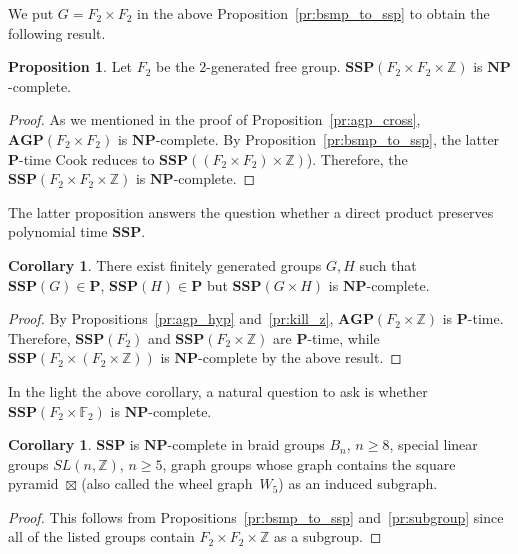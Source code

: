 \documentclass[10pt]{amsart}
\theoremstyle{definition}
\newtheorem{proposition}[theorem]{Proposition}
\newtheorem{corollary}[theorem]{Corollary}
\def\P{{\mathbf{P}}}
\def\NP{{\mathbf{NP}}}
\def\SSP{{\mathbf{SSP}}}
\def\AGP{{\mathbf{AGP}}}
\begin{document}
We put $G=F_2\times F_2$ in the above Proposition~\ref{pr:bsmp_to_ssp} to obtain the following result.
\begin{proposition}\label{pr:ssp_cross}
Let $F_2$ be the $2$-generated free group. $\SSP(F_2\times F_2\times \mathbb Z)$ is $\NP$-complete.
\end{proposition}
\begin{proof}
As we mentioned in the proof of Proposition~\ref{pr:agp_cross}, $\AGP(F_2\times F_2)$ is $\NP$-complete. By Proposition~\ref{pr:bsmp_to_ssp}, the latter $\P$-time Cook reduces to $\SSP((F_2\times F_2)\times\mathbb Z)$). Therefore, the $\SSP(F_2\times F_2\times \mathbb Z)$ is $\NP$-complete.
\end{proof}

The latter proposition answers the question whether a direct product preserves polynomial time $\SSP$.

\begin{corollary}\label{cor:NP_complete_ssp_cross}
There exist finitely generated groups $G,H$ such that $\SSP(G)\in\P$, $\SSP(H)\in\P$ but $\SSP(G\times H)$ is $\NP$-complete.
\end{corollary}
\begin{proof}
By Propositions~\ref{pr:agp_hyp} and~\ref{pr:kill_z}, $\AGP(F_2\times\mathbb Z)$ is $\P$-time. Therefore, $\SSP(F_2)$ and $\SSP(F_2\times\mathbb Z)$ are $\P$-time, while
$\SSP(F_2\times (F_2\times \mathbb Z))$ is $\NP$-complete by the above result.
\end{proof}
In the light the above corollary, a natural question to ask is whether $\SSP(F_2\times \mathbb F_2)$ is $\NP$-complete.


\begin{corollary}
$\SSP$ is $\NP$-complete in braid groups $B_n$, $n\ge 8$, special linear groups $SL(n,\mathbb Z)$, $n\ge 5$, graph groups whose graph contains the square pyramid~$\boxtimes$ (also called the wheel graph~$W_5$) as an induced subgraph.
\end{corollary}
\begin{proof}
This follows from Propositions~\ref{pr:bsmp_to_ssp} and~\ref{pr:subgroup} since all of the listed groups contain $F_2\times F_2\times \mathbb Z$ as a subgroup.
\end{proof}
\end{document}
